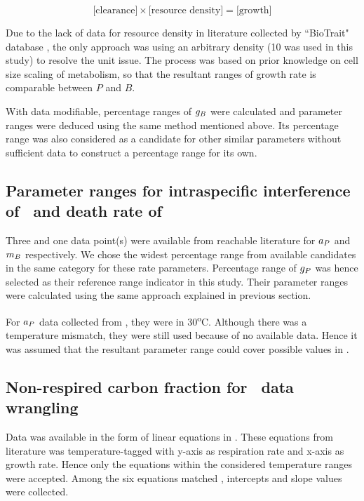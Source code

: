 \documentclass[../thesis.tex]{subfiles} %
\begin{document}
\begin{equation}
    \text{[clearance]} \times \text{[resource density]} = \text{[growth]}
    \label{eq:gB}
\end{equation}

Due to the lack of data for resource density in literature collected by ``BioTrait" database \autocite{della2013thermal}, the only approach was using an arbitrary density (10 was used in this study) to resolve the unit issue.  The process was based on prior knowledge on cell size scaling of metabolism, so that the resultant ranges of growth rate is comparable between $P$ and $B$.

With data modifiable, percentage ranges of $g_B$ were calculated and parameter ranges were deduced using the same method mentioned above.  Its percentage range was also considered as a candidate for other similar parameters without sufficient data to construct a percentage range for its own.

\subsection{Parameter ranges for intraspecific interference of \phy\ and death rate of \bac}
Three and one data point(s) were available from reachable literature for $a_P$ \autocite{de2007biofixation} and $m_B$ \autocite{cochran1988estimation} respectively.  We chose the widest percentage range from available candidates in the same category for these rate parameters.  Percentage range of $g_P$ was hence selected as their reference range indicator in this study.  Their parameter ranges were calculated using the same approach explained in previous section.

For $a_P$ data collected from \autocite{de2007biofixation}, they were in 30\textsuperscript{o}C.  Although there was a temperature mismatch, they were still used because of no available data.  Hence it was assumed that the resultant parameter range could cover possible values in \temp.

\subsection{Non-respired carbon fraction for \phy\ data wrangling}
Data was available in the form of linear equations in \autocite{j1989respiration}.  These equations from literature was temperature-tagged with y-axis as respiration rate and x-axis as growth rate.  Hence only the equations within the considered temperature ranges were accepted.  Among the six equations matched , intercepts and slope values were collected.
\end{document}
